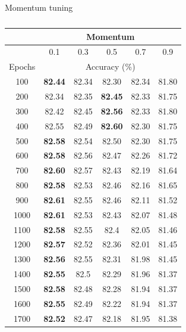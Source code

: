 \documentclass[12pt]{article}
\begin{document}
      \singlespacing
      \begin{table}[H]
        \caption{Momentum tuning}
        \begin{subtable}{.49\linewidth}
          \centering
          \caption{}
          \begin{tabular}{c|ccccc}
            \toprule
                  & \multicolumn{5}{c}{Momentum} \\
            \midrule
                  & \multicolumn{1}{c|}{0.1} & \multicolumn{1}{c|}{0.3} & \multicolumn{1}{c|}{0.5} & \multicolumn{1}{c|}{0.7} & 0.9 \\
            \midrule
            Epochs & \multicolumn{5}{c}{Accuracy (\%)} \\
            \midrule
            100   & \textbf{82.44} & 82.34 & 82.30 & 82.34 & 81.80 \\
            200   & 82.34 & 82.35 & \textbf{82.45} & 82.33 & 81.75 \\
            300   & 82.42 & 82.45 & \textbf{82.56} & 82.33 & 81.80 \\
            400   & 82.55 & 82.49 & \textbf{82.60} & 82.30 & 81.75 \\
            500   & \textbf{82.58} & 82.54 & 82.50 & 82.30 & 81.75 \\
            600   & \textbf{82.58} & 82.56 & 82.47 & 82.26 & 81.72 \\
            700   & \textbf{82.60} & 82.57 & 82.43 & 82.19 & 81.64 \\
            800   & \textbf{82.58} & 82.53 & 82.46 & 82.16 & 81.65 \\
            900   & \textbf{82.61} & 82.55 & 82.46 & 82.11 & 81.52 \\
            1000  & \textbf{82.61} & 82.53 & 82.43 & 82.07 & 81.48 \\
            1100  & \textbf{82.58} & 82.55 & 82.4  & 82.05 & 81.46 \\
            1200  & \textbf{82.57} & 82.52 & 82.36 & 82.01 & 81.45 \\
            1300  & \textbf{82.56} & 82.55 & 82.31 & 81.98 & 81.45 \\
            1400  & \textbf{82.55} & 82.5  & 82.29 & 81.96 & 81.37 \\
            1500  & \textbf{82.58} & 82.48 & 82.28 & 81.94 & 81.37 \\
            1600  & \textbf{82.55} & 82.49 & 82.22 & 81.94 & 81.37 \\
            1700  & \textbf{82.52} & 82.47 & 82.18 & 81.95 & 81.38 \\

\end{tabular}
\end{subtable}
\end{table}
\end{document}
